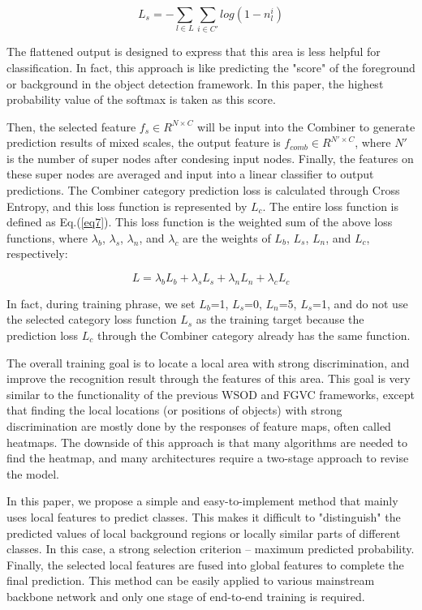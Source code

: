 \documentclass[conference]{IEEEtran}
\begin{document}
\begin{equation} \label{eq6}
    L_{s} = - \sum_{l \in L} \sum_{i \in C'} log(1 - n^{i}_{l})
\end{equation}

The flattened output is designed to express that this area is less helpful for classification. In fact, this approach is like predicting the "score" of the foreground or background in the object detection framework. In this paper, the highest probability value of the softmax is taken as this score.

Then, the selected feature $f_{s} \in R^{N\times C}$ will be input into the Combiner to generate prediction results of mixed scales, the output feature is $f_{comb} \in R^{N\prime \times C}$,  where $N\prime$ is the number of super nodes after condesing input nodes. Finally, the features on these super nodes are averaged and input into a linear classifier to output predictions. The Combiner category prediction loss is calculated through Cross Entropy, and this loss function is represented by $L_{c}$. The entire loss function is defined as Eq.(\ref{eq7}). This loss function is the weighted sum of the above loss functions, where $\lambda_{b}$, $\lambda_{s}$, $\lambda_{n}$, and $\lambda_{c}$ are the weights of $L_{b}$, $L_{s}$, $L_{n}$, and $L_{c}$, respectively:


\begin{equation} \label{eq7}
    L = \lambda _{b} L_{b} + \lambda _{s} L_{s} + \lambda _{n} L_{n} + \lambda _{c} L_{c}
\end{equation}

In fact, during training phrase, we set $L_{b}$=1, $L_{s}$=0, $L_{n}$=5, $L_{s}$=1, and do not use the selected category loss function $L_s$ as the training target because the prediction loss $L_{c}$ through the Combiner category already has the same function.

The overall training goal is to locate a local area with strong discrimination, and improve the recognition result through the features of this area. This goal is very similar to the functionality of the previous WSOD and FGVC frameworks, except that finding the local locations (or positions of objects) with strong discrimination are mostly done by the responses of feature maps, often called heatmaps. The downside of this approach is that many algorithms are needed to find the heatmap, and many architectures require a two-stage approach to revise the model.

In this paper, we propose a simple and easy-to-implement method that mainly uses local features to predict classes. This makes it difficult to "distinguish" the predicted values of local background regions or locally similar parts of different classes. In this case, a strong selection criterion -- maximum predicted probability. Finally, the selected local features are fused into global features to complete the final prediction. This method can be easily applied to various mainstream backbone network and only one stage of end-to-end training is required.
 
\end{document}
